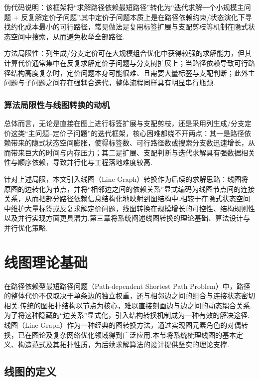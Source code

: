 伪代码说明：该框架将“求解路径依赖最短路径”转化为“迭代求解一个小规模主问题 + 反复解定价子问题”.其中定价子问题本质上是在路径依赖约束/状态演化下寻找约化成本最小的可行路径，常见做法是复用标签扩展与支配剪枝等机制在隐式状态空间中搜索，从而避免枚举全部路径.

方法局限性：列生成/分支定价可在大规模组合优化中获得较强的求解能力，但其计算代价通常集中在反复求解定价子问题与分支树扩展上；当路径依赖导致可行路径结构高度复杂时，定价问题本身可能很难、且需要大量标签与支配判断；此外主问题与子问题之间存在强耦合迭代，整体流程同样具有明显串行瓶颈.

\subsubsection{算法局限性与线图转换的动机}

总体而言，无论是直接在图上进行标签扩展与支配剪枝，还是采用列生成/分支定价这类“主问题--定价子问题”的迭代框架，核心困难都绕不开两点：其一是路径依赖带来的隐式状态空间膨胀，使得标签数、可行路径数或搜索分支数迅速增长，从而带来巨大的时间与内存压力；其二是扩展、支配判断与迭代求解具有强数据相关性与顺序依赖，导致并行化与工程落地难度较高.

针对上述局限，本文引入线图（Line Graph）转换作为后续的求解思路：线图将原图的边转化为节点，并将“相邻边之间的依赖关系”显式编码为线图节点间的连接关系，从而把部分路径依赖信息结构化地映射到图结构中.相较于在隐式状态空间中维护大量标签或反复求解定价问题，线图转换在规模增长的可控性、结构规则性以及并行实现方面更具潜力.第三章将系统阐述线图转换的理论基础、算法设计与并行优化策略.

\section{线图理论基础}

在路径依赖型最短路径问题（Path-dependent Shortest Path Problem）中，路径的整体代价不仅取决于单条边的独立权重，还与相邻边之间的组合与连接状态密切相关.传统的图拓扑结构以节点为核心，难以直接刻画边与边之间的动态耦合关系.为了将这种隐藏的“边关系”显式化，引入结构转换机制成为一种有效的解决途径.线图（Line Graph）作为一种经典的图转换方法，通过实现图元素角色的对偶转换，已在图论及复杂网络优化领域得到广泛应用\cite{whitney1932congruent,harary1960some,van1965interchange}.本节将系统梳理线图的基本定义、构造范式及其拓扑性质，为后续求解算法的设计提供坚实的理论支撑.

\subsection{线图的定义}

